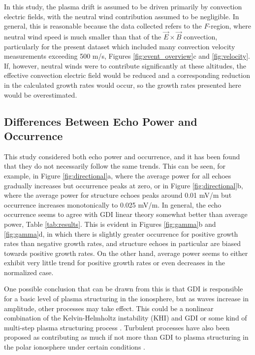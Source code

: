 In this study, the plasma drift is assumed to be driven primarily by convection electric fields, with the neutral wind contribution assumed to be negligible.  In general, this is reasonable because the data collected refers to the \(F\)-region, where neutral wind speed is much smaller than that of the \(\vec{E}\times\vec{B}\) convection, particularly for the present dataset which included many convection velocity measurements exceeding 500 m/s, Figures \ref{fig:event_overview}c and \ref{fig:velocity}.  If, however, neutral winds were to contribute significantly at these altitudes, the effective convection electric field would be reduced and a corresponding reduction in the calculated growth rates would occur, so the growth rates presented here would be overestimated.


\subsection{Differences Between Echo Power and Occurrence}
\label{sec:p3discussion3}
This study considered both echo power and occurrence, and it has been found that they do not necessarily follow the same trends.  This can be seen, for example, in Figure \ref{fig:directional}a, where the average power for all echoes gradually increases but occurrence peaks at zero, or in Figure \ref{fig:directional}b, where the average power for structure echoes peaks around 0.01 mV/m but occurrence increases monotonically to 0.025 mV/m.  In general, the echo occurrence seems to agree with GDI linear theory somewhat better than average power, Table \ref{tab:results}.  This is evident in Figures \ref{fig:gamma}b and \ref{fig:gamma}d, in which there is slightly greater occurrence for positive growth rates than negative growth rates, and structure echoes in particular are biased towards positive growth rates.  On the other hand, average power seems to either exhibit very little trend for positive growth rates or even decreases in the normalized case.

One possible conclusion that can be drawn from this is that GDI is responsible for a basic level of plasma structuring in the ionosphere, but as waves increase in amplitude, other processes may take effect.  This could be a nonlinear combination of the Kelvin-Helmholtz instability (KHI) and GDI \citep{Gondarenko2006} or some kind of multi-step plasma structuring process \citep{Carlson2007,Carlson2008}.  Turbulent processes have also been proposed as contributing as much if not more than GDI to plasma structuring in the polar ionosphere under certain conditions \citep{Burston2010,Spicher2015,Burston2016}.

